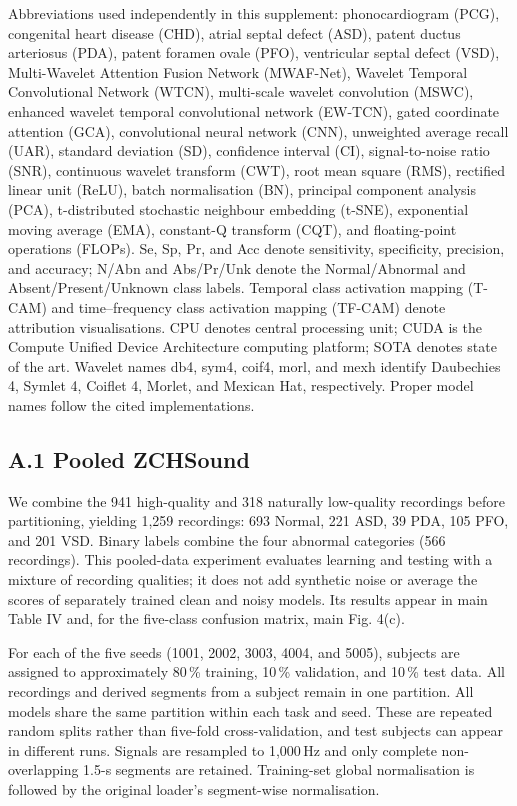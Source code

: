 {\fontsize{8.2}{9.6}\selectfont Abbreviations used independently in this supplement: phonocardiogram (PCG), congenital heart disease (CHD), atrial septal defect (ASD), patent ductus arteriosus (PDA), patent foramen ovale (PFO), ventricular septal defect (VSD), Multi-Wavelet Attention Fusion Network (MWAF-Net), Wavelet Temporal Convolutional Network (WTCN), multi-scale wavelet convolution (MSWC), enhanced wavelet temporal convolutional network (EW-TCN), gated coordinate attention (GCA), convolutional neural network (CNN), unweighted average recall (UAR), standard deviation (SD), confidence interval (CI), signal-to-noise ratio (SNR), continuous wavelet transform (CWT), root mean square (RMS), rectified linear unit (ReLU), batch normalisation (BN), principal component analysis (PCA), t-distributed stochastic neighbour embedding (t-SNE), exponential moving average (EMA), constant-Q transform (CQT), and floating-point operations (FLOPs). Se, Sp, Pr, and Acc denote sensitivity, specificity, precision, and accuracy; N/Abn and Abs/Pr/Unk denote the Normal/Abnormal and Absent/Present/Unknown class labels. Temporal class activation mapping (T-CAM) and time--frequency class activation mapping (TF-CAM) denote attribution visualisations. CPU denotes central processing unit; CUDA is the Compute Unified Device Architecture computing platform; SOTA denotes state of the art. Wavelet names db4, sym4, coif4, morl, and mexh identify Daubechies 4, Symlet 4, Coiflet 4, Morlet, and Mexican Hat, respectively. Proper model names follow the cited implementations.}

\begingroup\fontsize{10}{11.6}\selectfont
\subsection*{A.1 Pooled ZCHSound}
We combine the 941 high-quality and 318 naturally low-quality recordings before partitioning, yielding 1,259 recordings: 693 Normal, 221 ASD, 39 PDA, 105 PFO, and 201 VSD. Binary labels combine the four abnormal categories (566 recordings). This pooled-data experiment evaluates learning and testing with a mixture of recording qualities; it does not add synthetic noise or average the scores of separately trained clean and noisy models. Its results appear in main Table IV and, for the five-class confusion matrix, main Fig. 4(c).

For each of the five seeds (1001, 2002, 3003, 4004, and 5005), subjects are assigned to approximately 80\,\% training, 10\,\% validation, and 10\,\% test data. All recordings and derived segments from a subject remain in one partition. All models share the same partition within each task and seed. These are repeated random splits rather than five-fold cross-validation, and test subjects can appear in different runs. Signals are resampled to 1,000\,Hz and only complete non-overlapping 1.5-s segments are retained. Training-set global normalisation is followed by the original loader's segment-wise normalisation.

